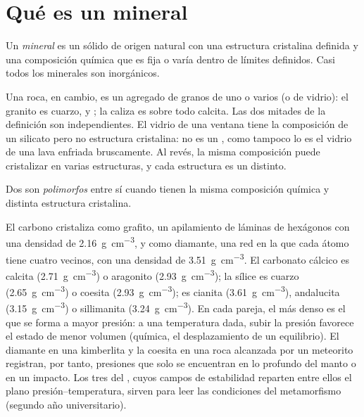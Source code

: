 \section{Qué es un mineral}

\begin{definition}[Mineral]\label{def:b1:rock-forming-minerals:mineral}
Un \emph{mineral} es un sólido de origen natural con una estructura cristalina definida y
una composición química que es fija o varía dentro de límites definidos. Casi todos los minerales son
inorgánicos.
\end{definition}

Una roca, en cambio, es un agregado de granos de uno o varios  (o de vidrio): el granito es
cuarzo,  y ; la caliza es sobre todo calcita. Las dos mitades de la definición son
independientes. El vidrio de una ventana tiene la composición de un silicato pero no estructura
cristalina: no es un , como tampoco lo es el vidrio de una lava enfriada bruscamente. Al revés,
la misma composición puede cristalizar en varias estructuras, y cada estructura es un  distinto.

\begin{definition}[Polimorfo]\label{def:b1:rock-forming-minerals:polymorph}
Dos  son \emph{polimorfos} entre sí cuando tienen la misma composición química
y distinta estructura cristalina.
\end{definition}

El carbono cristaliza como grafito, un apilamiento de láminas de hexágonos con una densidad de
\qty{2.16}{g.cm^{-3}}, y como diamante, una red en la que cada átomo tiene cuatro vecinos, con una
densidad de \qty{3.51}{g.cm^{-3}}. El carbonato cálcico es calcita (\qty{2.71}{g.cm^{-3}}) o aragonito
(\qty{2.93}{g.cm^{-3}}); la sílice es cuarzo (\qty{2.65}{g.cm^{-3}}) o coesita
(\qty{2.93}{g.cm^{-3}});  es cianita (\qty{3.61}{g.cm^{-3}}), andalucita
(\qty{3.15}{g.cm^{-3}}) o sillimanita (\qty{3.24}{g.cm^{-3}}).
En cada pareja, el  más denso es el que se forma a mayor presión: a una temperatura dada, subir la
presión favorece el estado de menor volumen (química, el desplazamiento de un equilibrio). El diamante en
una kimberlita y la coesita en una roca alcanzada por un meteorito registran, por tanto, presiones que solo se
encuentran en lo profundo del manto o en un impacto. Los tres  del , cuyos campos de
estabilidad reparten entre ellos el plano presión--temperatura, sirven para leer las condiciones del
metamorfismo (segundo año universitario).

